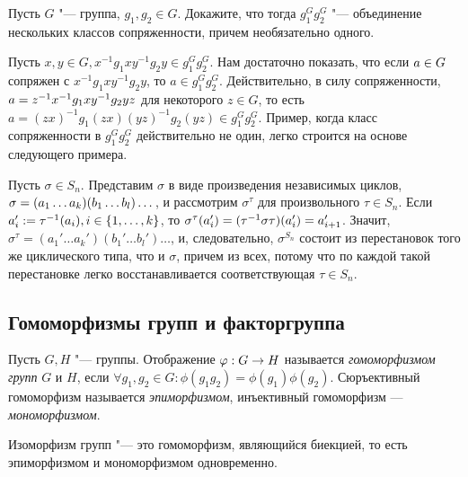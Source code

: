\begin{exercise}
	Пусть $G$ "--- группа, $g_1, g_2 \in G$. Докажите, что тогда $g_1^Gg_2^G$ "--- объединение нескольких классов сопряженности, причем необязательно одного.
\end{exercise}

\begin{solution}
	Пусть $x, y \in G, x^{-1}g_1xy^{-1}g_2y \in g_1^Gg_2^G$. Нам достаточно показать, что если $a \hm\in G$ сопряжен с $x^{-1}g_1xy^{-1}g_2y$, то $a \in g_1^Gg_2^G$. Действительно, в силу сопряженности, $a \hm= z^{-1}x^{-1}g_1xy^{-1}g_2yz$ для некоторого $z \in G$, то есть $a = (zx)^{-1}g_1(zx)(yz)^{-1}g_2(yz) \in g_1^Gg_2^G$. Пример, когда класс сопряженности в $g_1^Gg_2^G$ действительно не один, легко строится на основе следующего примера.
\end{solution}

\begin{example}
	Пусть $\sigma \in S_n$. Представим $\sigma$ в виде произведения независимых циклов, $\sigma \hm= (a_1\dotsc a_k)(b_1\dotsc b_l)\dotsc$, и рассмотрим $\sigma^\tau$ для произвольного $\tau \in S_n$. Если $a_i' := \tau^{-1}(a_i), i \hm\in \{1, \dots, k\}$, то $\sigma^\tau(a_i') \hm= (\tau^{-1}\sigma\tau)(a_i') = a_{i + 1}'$. Значит, $\sigma^\tau = (a_1'\dotsc a_k')(b_1'\dotsc b_l')\dotsc$, и, следовательно, $\sigma^{S_n}$ состоит из перестановок того же циклического типа, что и $\sigma$, причем из всех, потому что по каждой такой перестановке легко восстанавливается соответствующая $\tau \in S_n$.
\end{example}

\subsection{Гомоморфизмы групп и факторгруппа}

\begin{definition}
	Пусть $G, H$ "--- группы. Отображение $\phi : G \hm\to H$ называется \textit{гомоморфизмом групп} $G$ и $H$, если $\forall g_1, g_2 \in G: \phi(g_1g_2) = \phi(g_1)\phi(g_2)$. Сюръективный гомоморфизм называется \textit{эпиморфизмом}, инъективный гомоморфизм --- \textit{мономорфизмом}.
\end{definition}

\begin{note}
	Изоморфизм групп "--- это гомоморфизм, являющийся биекцией, то есть эпиморфизмом и мономорфизмом одновременно.
\end{note}

